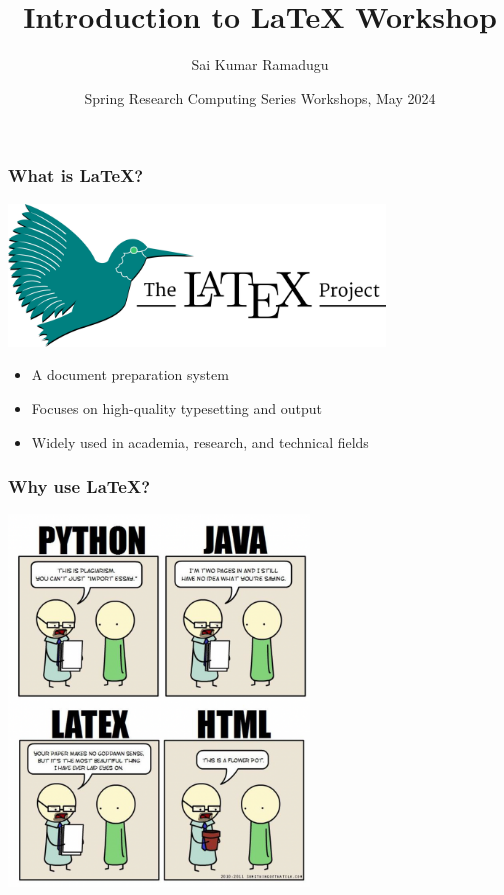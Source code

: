 \documentclass{beamer}
\title[LaTeX]
{Introduction to LaTeX Workshop}
\author{Sai Kumar Ramadugu}
\institute{Research Computing and Data Services, \\
           Northwestern University}
\date[SRCW 2024] 
{Spring Research Computing Series Workshops, May 2024}
\begin{document}
\begin{frame}
  \titlepage
\end{frame} 

\begin{frame} 
  \frametitle{What is LaTeX?}
  \begin{center}
    \includegraphics[width=0.75\textwidth]{LaTeX_project_logo}  %
  \end{center}

  \begin{itemize}
    \item A document preparation system 
    \item Focuses on high-quality typesetting and output
    \item Widely used in academia, research, and technical fields
  \end{itemize}
\end{frame}


\begin{frame} 
  \frametitle{Why use LaTeX?}
\begin{center} 
\includegraphics[width=0.6\textwidth]{whylatex3} 
\end{center}
\end{frame}
\end{document}
